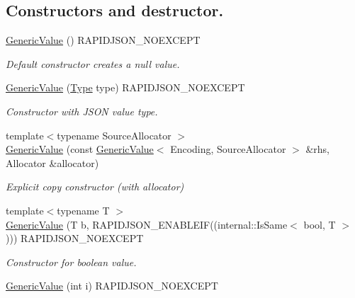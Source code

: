 \subsection*{Constructors and destructor.}
\begin{DoxyCompactItemize}
\item 
\mbox{\label{a01992_ab0205d57176d83814ea4e4598c596fe8}} 
\hyperlink{a01992_ab0205d57176d83814ea4e4598c596fe8}{Generic\+Value} () R\+A\+P\+I\+D\+J\+S\+O\+N\+\_\+\+N\+O\+E\+X\+C\+E\+PT
\begin{DoxyCompactList}\small\item\em Default constructor creates a null value. \end{DoxyCompactList}\item 
\hyperlink{a01992_a83c8f84b8e61f2f40414b703b75aea61}{Generic\+Value} (\hyperlink{a00560_a1d1cfd8ffb84e947f82999c682b666a7}{Type} type) R\+A\+P\+I\+D\+J\+S\+O\+N\+\_\+\+N\+O\+E\+X\+C\+E\+PT
\begin{DoxyCompactList}\small\item\em Constructor with J\+S\+ON value type. \end{DoxyCompactList}\item 
{\footnotesize template$<$typename Source\+Allocator $>$ }\\\hyperlink{a01992_a5161c0c98ba9144c50a38acde28a5ede}{Generic\+Value} (const \hyperlink{a01992}{Generic\+Value}$<$ Encoding, Source\+Allocator $>$ \&rhs, Allocator \&allocator)
\begin{DoxyCompactList}\small\item\em Explicit copy constructor (with allocator) \end{DoxyCompactList}\item 
{\footnotesize template$<$typename T $>$ }\\\hyperlink{a01992_a0f6a0394bfffaedde88e433b2265194c}{Generic\+Value} (T b, R\+A\+P\+I\+D\+J\+S\+O\+N\+\_\+\+E\+N\+A\+B\+L\+E\+IF((internal\+::\+Is\+Same$<$ bool, T $>$))) R\+A\+P\+I\+D\+J\+S\+O\+N\+\_\+\+N\+O\+E\+X\+C\+E\+PT
\begin{DoxyCompactList}\small\item\em Constructor for boolean value. \end{DoxyCompactList}\item 
\mbox{\label{a01992_aafc754ade38421c179f5c8933ecbaf45}} 
\hyperlink{a01992_aafc754ade38421c179f5c8933ecbaf45}{Generic\+Value} (int i) R\+A\+P\+I\+D\+J\+S\+O\+N\+\_\+\+N\+O\+E\+X\+C\+E\+PT

\end{DoxyCompactItemize}
